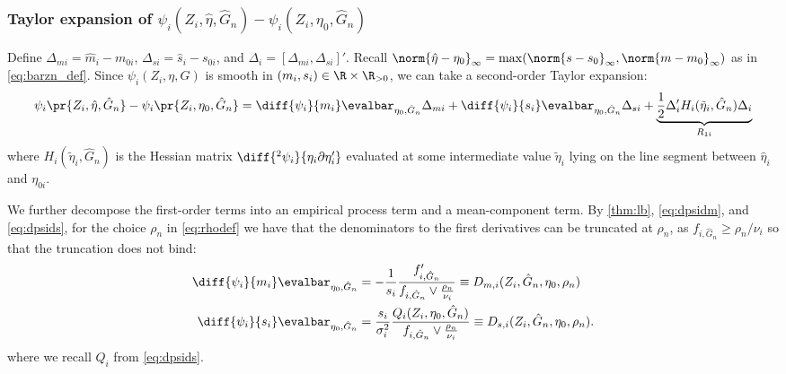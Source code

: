\documentclass[12pt, reqno]{amsart}
\newcommand{\hatm}{\hat m}
\newcommand{\hats}{\hat s}
\newcommand{\hateta}{\hat\eta}
\newcommand{\Dinfty}{\norm{\hateta - \eta_0}_{\infty}} %
\numberwithin{equation}{section}
\begin{document}
\begin{refsection}
\begin{appendices}
\subsubsection{Taylor expansion of $\psi_i(Z_i, \hat\eta, \hat G_n) - \psi_i(Z_i, \eta_0,
\hat G_n)$}
Define
$\Delta_{mi} = \hatm_i - m_{0i}$, $\Delta_{si} = \hats_i - s_{0i}$, and $\Delta_i =
[\Delta_{mi}, \Delta_{si}]'$. Recall $\Dinfty = \max(
\norm{s-s_0}_\infty, \norm{m-m_0}_\infty)$ as in \eqref{eq:barzn_def}.
Since $\psi_i(Z_i, \eta, G)$ is smooth in $(m_i, s_i) \in \R \times \R_{> 0}$, we can take
a second-order Taylor expansion:
\begin{align}
\psi_i\pr{Z_i, \hateta, \hat G_n} - \psi_i\pr{Z_i, \eta_0, \hat G_n}  = \diff{\psi_i}
{m_i}\evalbar_{\eta_0, \hat G_n} \Delta_{mi} + \diff{\psi_i}{s_i}\evalbar_
{\eta_0, \hat G_n} \Delta_{si} + \underbrace{\frac{1}{2} \Delta_i' H_i(\tilde\eta_i,
\hat G_n)
\Delta_i}_{R_{1i}} \label{eq:decomposition_hatG}
\end{align}
where $H_i(\tilde \eta_i ,\hat G_n)$ is the Hessian matrix $\diff{^2\psi_i}
{\eta_i \partial
\eta_i'}$ evaluated at some intermediate value $\tilde \eta_i$ lying on the line segment
between $\hateta_i$ and $\eta_{0i}$.

We further decompose the first-order terms into an empirical process term and a
mean-component term. By \cref{thm:lb}, \eqref{eq:dpsidm}, and \eqref{eq:dpsids}, for the
choice $\rho_n$ in \eqref{eq:rhodef} we have that the denominators to the first
derivatives can be truncated at $\rho_n$, as $f_{i, \hat G_n} \ge \rho_n/\nu_i$ so that
the truncation does not bind:
\begin{align}
\diff{\psi_i}{m_i}\evalbar_{\eta_0, \hat G_n}
&= -\frac{1}{s_i} \frac{
f'_{i, \hat G_n}
}{f_{i, \hat G_n} \vee \frac{\rho_n}{\nu_i}} \equiv D_{m,i}(Z_i,
\hat G_n, \eta_0, \rho_n)
\label{eq:dm_defn}
\\
\diff{\psi_i}{s_i}\evalbar_{\eta_0, \hat G_n}
&= \frac{s_i}{\sigma_i^2} \frac{
Q_i(Z_i, \eta_0, \hat G_n)
}{ f_{i, \hat G_n} \vee \frac{\rho_n}{\nu_i}} \equiv D_{s,i}(Z_i,
\hat G_n, \eta_0, \rho_n).
\label{eq:ds_defn}
\end{align}
where we recall $Q_i$ from \eqref{eq:dpsids}.


\end{appendices}
\end{refsection}
\end{document}

